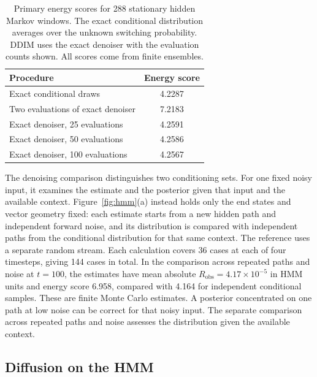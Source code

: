 \documentclass{article}
\begin{document}
\begin{table}[h]
\centering
\caption{Primary energy scores for 288 stationary hidden Markov windows. The exact conditional distribution averages over the unknown switching probability. DDIM uses the exact denoiser with the evaluation counts shown. All scores come from finite ensembles.}
\label{tab:oracle}
\begin{tabular}{lc}
\toprule
Procedure & Energy score \\
\midrule
Exact conditional draws & 4.2287 \\
Two evaluations of exact denoiser & 7.2183 \\
Exact denoiser, 25 evaluations & 4.2591 \\
Exact denoiser, 50 evaluations & 4.2586 \\
Exact denoiser, 100 evaluations & 4.2567 \\
\bottomrule
\end{tabular}
\end{table}

The denoising comparison distinguishes two conditioning sets. For one fixed noisy input, it examines the estimate and the posterior given that input and the available context. Figure~\ref{fig:hmm}(a) instead holds only the end states and vector geometry fixed: each estimate starts from a new hidden path and independent forward noise, and its distribution is compared with independent paths from the conditional distribution for that same context. The reference uses a separate random stream. Each calculation covers 36 cases at each of four timesteps, giving 144 cases in total. In the comparison across repeated paths and noise at $t=100$, the estimates have mean absolute $R_{\mathrm{obs}}=4.17\times10^{-5}$ in HMM units and energy score 6.958, compared with 4.164 for independent conditional samples. These are finite Monte Carlo estimates. A posterior concentrated on one path at low noise can be correct for that noisy input. The separate comparison across repeated paths and noise assesses the distribution given the available context.

\subsection{Diffusion on the HMM}
\end{document}

